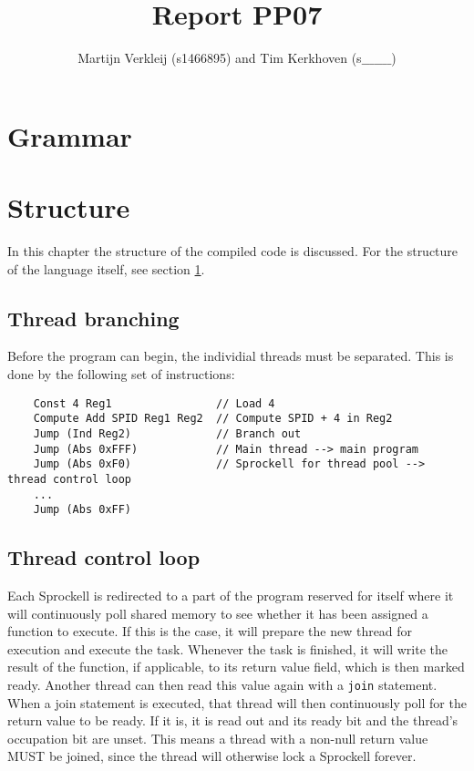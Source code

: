 \documentclass[10pt,a4paper]{report}
\author{Martijn Verkleij (s1466895) and Tim Kerkhoven (s$\_\_\_\_\_\_\_$)}
\title{Report PP07}
\begin{document}
\maketitle
\tableofcontents

\chapter{Grammar} \label{chp:grammar}

\chapter{Structure} \label{chp:structure}
In this chapter the structure of the compiled code is discussed. For the structure of the language itself, see section \ref{chp:grammar}. 
\section{Thread branching}
Before the program can begin, the individial threads must be separated. This is done by the following set of instructions:
\begin{verbatim}
	Const 4 Reg1				// Load 4
	Compute Add SPID Reg1 Reg2	// Compute SPID + 4 in Reg2
	Jump (Ind Reg2)				// Branch out
	Jump (Abs 0xFFF)			// Main thread --> main program
	Jump (Abs 0xF0)				// Sprockell for thread pool --> thread control loop
	...
	Jump (Abs 0xFF)
\end{verbatim}

\section{Thread control loop}
Each Sprockell is redirected to a part of the program reserved for itself where it will continuously poll shared memory to see whether it has been assigned a function to execute. If this is the case, it will prepare the new thread for execution and execute the task. Whenever the task is finished, it will write the result of the function, if applicable, to its return value field, which is then marked ready. Another thread can then read this value again with a \texttt{join} statement. When a join statement is executed, that thread will then continuously poll for the return value to be ready. If it is, it is read out and its ready bit and the thread's occupation bit are unset. This means a thread with a non-null return value MUST be joined, since the thread will otherwise lock a Sprockell forever. 
\end{document}
